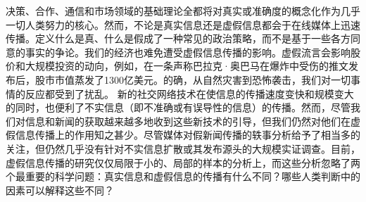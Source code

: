 \documentclass[a4paper,oneside,12pt]{book}
\begin{document}
\thispagestyle{empty}

\begin{center}
\sihao{}

\xiaosihao{}

\xiaosihao{}
\end{center}

\songti{}
决策、合作、通信和市场领域的基础理论全都将对真实或准确度的概念化作为几乎一切人类努力的核心。然而，不论是真实信息还是虚假信息都会于在线媒体上迅速传播。定义什么是真、什么是假成了一种常见的政治策略，而不是基于一些各方同意的事实的争论。我们的经济也难免遭受虚假信息传播的影响。虚假流言会影响股价和大规模投资的动向，例如，在一条声称巴拉克·奥巴马在爆炸中受伤的推文发布后，股市市值蒸发了1300亿美元。的确，从自然灾害到恐怖袭击，我们对一切事情的反应都受到了扰乱。
新的社交网络技术在使信息的传播速度变快和规模变大的同时，也便利了不实信息（即不准确或有误导性的信息）的传播。然而，尽管我们对信息和新闻的获取越来越多地收到这些新技术的引导，但我们仍然对他们在虚假信息传播上的作用知之甚少。尽管媒体对假新闻传播的轶事分析给予了相当多的关注，但仍然几乎没有针对不实信息扩散或其发布源头的大规模实证调查。目前，虚假信息传播的研究仅仅局限于小的、局部的样本的分析上，而这些分析忽略了两个最重要的科学问题：真实信息和虚假信息的传播有什么不同？哪些人类判断中的因素可以解释这些不同？

\thispagestyle{empty}
\begin{center}


\end{center}
\end{document}
